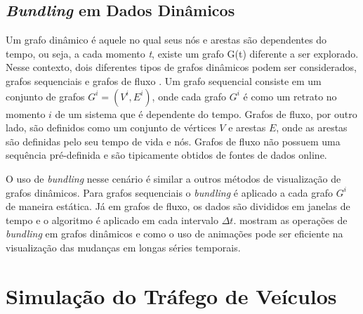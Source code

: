 \subsection{\emph{Bundling} em Dados Dinâmicos}

  Um grafo dinâmico é aquele no qual seus nós e arestas são dependentes do
tempo, ou seja, a cada momento \emph{t}, existe um grafo G(t) diferente a ser
explorado. Nesse contexto, dois diferentes tipos de grafos dinâmicos podem ser
considerados, grafos sequenciais e grafos de fluxo \citep{Hurter2013}. Um
grafo sequencial consiste em um conjunto de grafos $G^i = (V^i, E^i)$, onde
cada grafo $G^i$ é como um retrato no momento $i$ de um sistema que é
dependente do tempo. Grafos de fluxo, por outro lado, são definidos como um
conjunto de vértices $V$ e arestas $E$, onde as arestas são definidas pelo seu
tempo de vida e nós. Grafos de fluxo não possuem uma sequência pré-definida e
são tipicamente obtidos de fontes de dados online.

  O uso de \emph{bundling} nesse cenário é similar a outros métodos de
visualização de grafos dinâmicos. Para grafos sequenciais o \emph{bundling} é
aplicado a cada grafo $G^i$ de maneira estática. Já em grafos de fluxo, os
dados são divididos em janelas de tempo e o algoritmo é aplicado em cada
intervalo $\Delta t$. \cite{Hurter2014} mostram as operações de \emph{bundling} em
grafos dinâmicos e como o uso de animações pode ser eficiente na visualização
das mudanças em longas séries temporais.



\section{Simulação do Tráfego de Veículos}

